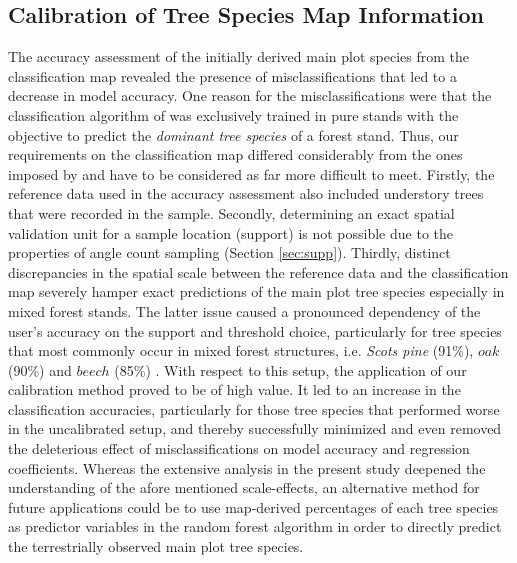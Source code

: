 \subsection{Calibration of Tree Species Map Information}
\label{sec:calib_dis}
The accuracy assessment of the initially derived main plot species from the classification map revealed the presence of misclassifications that led to a decrease in model accuracy.  One reason for the misclassifications were that the classification algorithm of \citet{stoffels2015} was exclusively trained in pure stands with the objective to predict the \textit{dominant tree species} of a forest stand. Thus, our requirements on the classification map differed considerably from the ones imposed by \citet{stoffels2015} and have to be considered as far more difficult to meet. Firstly, the reference data used in the accuracy assessment also included understory trees that were recorded in the \bwi{} sample. Secondly, determining an exact spatial validation unit for a sample location (support) is not possible due to the properties of angle count sampling (Section \ref{sec:supp}). Thirdly, distinct discrepancies in the spatial scale between the reference data and the classification map severely hamper exact predictions of the main plot tree species especially in mixed forest stands. The latter issue caused a pronounced dependency of the user's accuracy on the support and threshold choice, particularly for tree species that most commonly occur in mixed forest structures, i.e. \textit{Scots pine} (91\%), $oak$ (90\%) and $beech$ (85\%) \citep{bwi3}. With respect to this setup, the application of our calibration method proved to be of high value. It led to an increase in the classification accuracies, particularly for those tree species that performed worse in the uncalibrated setup, and thereby successfully minimized and even removed the deleterious effect of misclassifications on model accuracy and regression coefficients. Whereas the extensive analysis in the present study deepened the understanding of the afore mentioned scale-effects, an alternative method for future applications could be to use map-derived percentages of each tree species as predictor variables in the random forest algorithm in order to directly predict the terrestrially observed main plot tree species.


